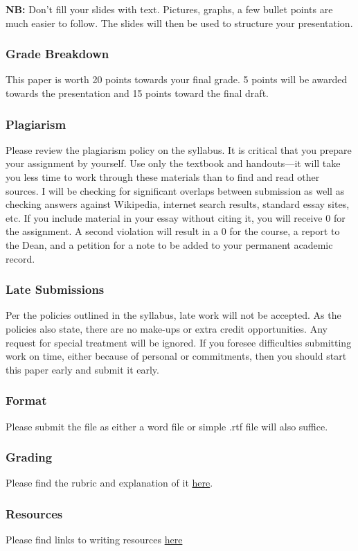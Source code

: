 \documentclass[]{article}
\begin{document}
\textbf{NB:} Don't fill your slides with text. Pictures, graphs, a few
bullet points are much easier to follow. The slides will then be used to
structure your presentation.

\subsubsection{Grade Breakdown}\label{grade-breakdown}

This paper is worth 20 points towards your final grade. 5 points will be
awarded towards the presentation and 15 points toward the final draft.

\subsubsection{Plagiarism}\label{plagiarism}

Please review the plagiarism policy on the syllabus. It is critical that
you prepare your assignment by yourself. Use only the textbook and
handouts---it will take you less time to work through these materials
than to find and read other sources. I will be checking for significant
overlaps between submission as well as checking answers against
Wikipedia, internet search results, standard essay sites, etc. If you
include material in your essay without citing it, you will receive 0 for
the assignment. A second violation will result in a 0 for the course, a
report to the Dean, and a petition for a note to be added to your
permanent academic record.

\subsubsection{Late Submissions}\label{late-submissions}

Per the policies outlined in the syllabus, late work will not be
accepted. As the policies also state, there are no make-ups or extra
credit opportunities. Any request for special treatment will be ignored.
If you foresee difficulties submitting work on time, either because of
personal or commitments, then you should start this paper early and
submit it early.

\subsubsection{Format}\label{format}

Please submit the file as either a word file or simple .rtf file will
also suffice.

\subsubsection{Grading}\label{grading}

Please find the rubric and explanation of it
\href{/Teaching/Grading/}{here}.

\subsubsection{Resources}\label{resources}

Please find links to writing resources \href{/Teaching/Resources/}{here}
\end{document}
